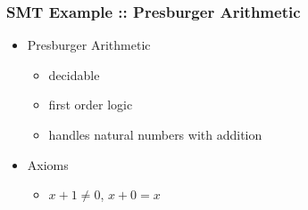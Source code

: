 
\begin{frame}

\frametitle{SMT Example :: Presburger Arithmetic}

\begin{itemize}

\item<1-> Presburger Arithmetic

\begin{itemize}

\item decidable

\item first order logic

\item handles natural numbers with addition

\end{itemize}

\item<2-> Axioms

\begin{itemize}

\item $x + 1 \neq 0$, $x + 0 = x$


\end{itemize}
\end{itemize}
\end{frame}
